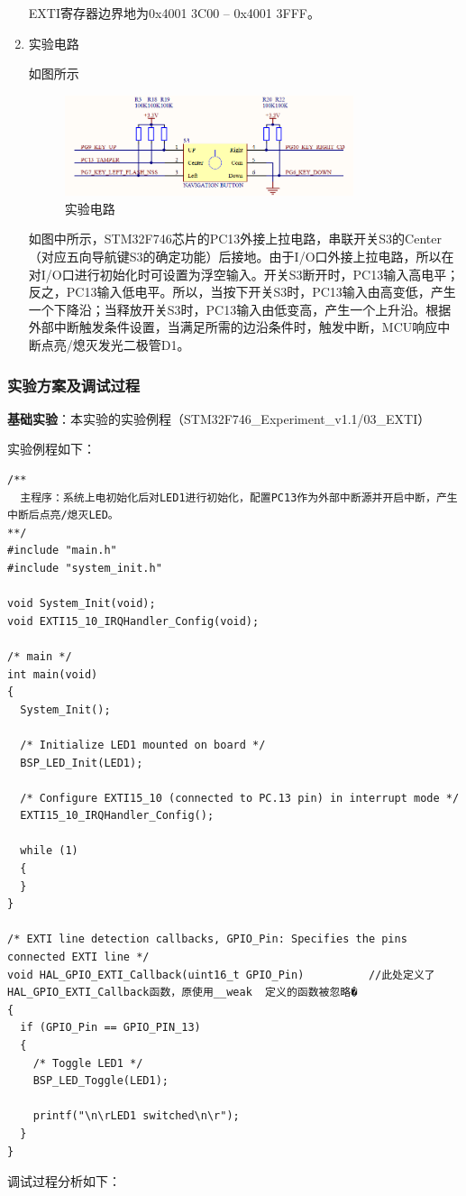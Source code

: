 ﻿\documentclass[UTF8,12pt]{article}
\begin{document}
\begin{enumerate}
  EXTI寄存器边界地为0x4001 3C00 – 0x4001 3FFF。

  \item 实验电路
  
  如图所示

  \begin{figure}[htbp]
    \centering
    \includegraphics[width=0.8\textwidth]{imgs/11.png}
    \caption{实验电路}
  \end{figure}

  如图中所示，STM32F746芯片的PC13外接上拉电路，串联开关S3的Center（对应五向导航键S3的确定功能）后接地。由于I/O口外接上拉电路，所以在对I/O口进行初始化时可设置为浮空输入。开关S3断开时，PC13输入高电平；反之，PC13输入低电平。所以，当按下开关S3时，PC13输入由高变低，产生一个下降沿；当释放开关S3时，PC13输入由低变高，产生一个上升沿。根据外部中断触发条件设置，当满足所需的边沿条件时，触发中断，MCU响应中断点亮/熄灭发光二极管D1。
\end{enumerate}

\subsubsection{实验方案及调试过程}
\noindent
\textbf{基础实验}：本实验的实验例程（STM32F746\_Experiment\_v1.1/03\_EXTI）

实验例程如下：

\begin{lstlisting}[frame=shadowbox]
/**
  主程序：系统上电初始化后对LED1进行初始化，配置PC13作为外部中断源并开启中断，产生中断后点亮/熄灭LED。
**/
#include "main.h"
#include "system_init.h"

void System_Init(void);
void EXTI15_10_IRQHandler_Config(void);

/* main */
int main(void)
{
  System_Init();
  
  /* Initialize LED1 mounted on board */
  BSP_LED_Init(LED1);
  
  /* Configure EXTI15_10 (connected to PC.13 pin) in interrupt mode */
  EXTI15_10_IRQHandler_Config();
  
  while (1)
  {
  }
}

/* EXTI line detection callbacks, GPIO_Pin: Specifies the pins connected EXTI line */
void HAL_GPIO_EXTI_Callback(uint16_t GPIO_Pin)			//此处定义了HAL_GPIO_EXTI_Callback函数，原使用__weak  定义的函数被忽略�
{
  if (GPIO_Pin == GPIO_PIN_13)
  {
    /* Toggle LED1 */
    BSP_LED_Toggle(LED1);
    
    printf("\n\rLED1 switched\n\r");
  }
}
\end{lstlisting}
调试过程分析如下：
\end{document}

